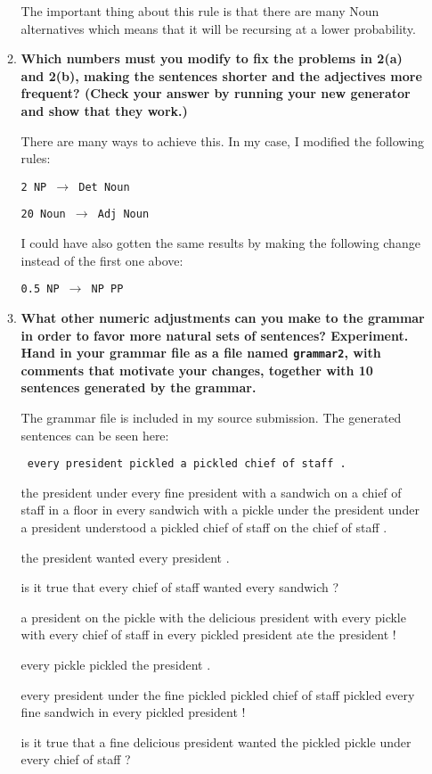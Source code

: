 \documentclass[10pt]{article}
\begin{document}
\begin{enumerate}
\begin{enumerate}
The important thing about this rule is that there are many Noun alternatives which means that it will be recursing at a lower probability.

\item {\bf Which numbers must you modify to fix the problems in 2(a) and
    2(b), making the sentences shorter and the adjectives more
    frequent? (Check your answer by running your new generator and
    show that they work.)}

There are many ways to achieve this. In my case, I modified the following rules:

{\tt 2 NP $\rightarrow$ Det Noun}

{\tt 20 Noun $\rightarrow$ Adj Noun}

I could have also gotten the same results by making the following change instead of the first one above:

{\tt 0.5 NP $\rightarrow$ NP PP}

\item {\bf What other numeric adjustments can you make to the grammar in
  order to favor more natural sets of sentences? Experiment. Hand in
  your grammar file as a file named \verb+grammar2+, with comments that
  motivate your changes, together with 10 sentences generated by the
  grammar.}

The grammar file is included in my source submission. The generated sentences can be seen here:

{\tt
every president pickled a pickled chief of staff .

the president under every fine president with a sandwich on a chief of staff in a floor in every sandwich with a pickle under the president under a president understood a pickled chief of staff on the chief of staff .

the president wanted every president .

is it true that every chief of staff wanted every sandwich ?

a president on the pickle with the delicious president with every pickle with every chief of staff in every pickled president ate the president !

every pickle pickled the president .

every president under the fine pickled pickled chief of staff pickled every fine sandwich in every pickled president !

is it true that a fine delicious president wanted the pickled pickle under every chief of staff ?

}
\end{enumerate}
\end{enumerate}
\end{document}
